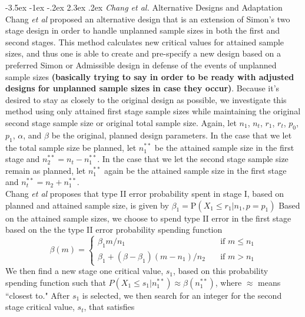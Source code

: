 \documentclass[12pt]{report}\usepackage[]{graphicx}\usepackage[]{color}
\makeatletter
\newlength{\li}\setlength{\li}{14.48pt}
\newlength{\di}\setlength{\di}{-3.5mm}
\renewcommand\subsection{\@startsection {subsection}{2}{\z@}%
                                   {-3.5ex \@plus -1ex \@minus -.2ex}%
                                   {2.3ex \@plus.2ex}%
                                   {\noindent \large \fontfamily{qcs}\selectfont }}
\makeatother
\begin{document}
\subsection{\textit{Chang et al.} Alternative Designs and Adaptation}
Chang \textit{et al} \cite{Chang} proposed an alternative design that is an extension of Simon's two stage design in order to handle unplanned sample sizes in both the first and second stages. This method calculates new critical values for attained sample sizes, and thus one is able to create and pre-specify a new design based on a preferred Simon or Admissible design in defense of the events of unplanned sample sizes \textbf{(basically trying to say in order to be ready with adjusted designs for unplanned sample sizes in case they occur)}. Because it's desired to stay as closely to the original design as possible, we investigate this method using only attained first stage sample sizes while maintaining the original second stage sample size or original total sample size. Again, let $n_1$, $n_t$, $r_1$, $r_t$, $p_0$, $p_1$, $\alpha$, and $\beta$ be the original, planned design parameters. In the case that we let the total sample size be planned, let $n_1^{\ast \ast}$ be the attained sample size in the first stage and $n_2^{\ast\ast} = n_t - n_1^{\ast\ast}$. In the case that we let the second stage sample size remain as planned, let $n_1^{\ast\ast}$ again be the attained sample size in the first stage and $n_t^{\ast\ast} = n_2 + n_1^{\ast\ast}$. \\
\indent Chang \textit{et al} proposes that type II error probability spent in stage I, based on planned and attained sample size, is given by $\beta_1 = \mbox{P}(X_1 \leq r_1 \vert n_1, p = p_1)$ Based on the attained sample sizes, we choose to spend type II error in the first stage based on the the type II error probability spending function 
$$
\beta(m) = \left\{
        \begin{array}{ll}
            \beta_1 m/n_1 & \quad \text{if } m\leq n_1 \\
            \beta_1 + (\beta - \beta_1)(m - n_1)/n_2 & \quad \text{if } m > n_1
        \end{array}
    \right.
$$
We then find a new stage one critical value, $s_1$, based on this probability spending function such that $P(X_1 \leq s_1 | n_1^{\ast\ast}) \approx \beta(n_1^{\ast\ast})$, where $\approx$ means ``closest to." After $s_1$ is selected, we then search for an integer for the second stage critical value, $s_t$, that satisfies
\end{document}
